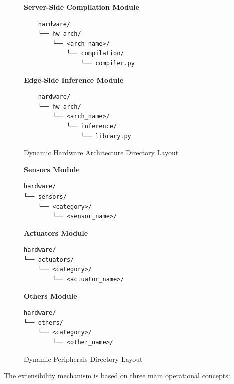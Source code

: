 \begin{figure}[H]
    \centering
    \begin{minipage}{0.48\textwidth}
        \centering
        \textbf{Server-Side Compilation Module}
        \begin{verbatim}
    hardware/
    └── hw_arch/
        └── <arch_name>/
            └── compilation/
                └── compiler.py
        \end{verbatim}
    \end{minipage}
    \hfill
    \begin{minipage}{0.48\textwidth}
        \centering
        \textbf{Edge-Side Inference Module}
        \begin{verbatim}
    hardware/
    └── hw_arch/
        └── <arch_name>/
            └── inference/
                └── library.py
        \end{verbatim}
    \end{minipage}
    \caption{Dynamic Hardware Architecture Directory Layout}
    \label{fig:hw_arch_layout}
\end{figure}

\begin{figure}[H]
    \centering
    \begin{minipage}{0.23\textwidth}
        \centering
        \textbf{Sensors Module}
        \begin{verbatim}
hardware/
└── sensors/
    └── <category>/
        └── <sensor_name>/
        \end{verbatim}
    \end{minipage}
    \hfill
    \begin{minipage}{0.23\textwidth}
        \centering
        \textbf{Actuators Module}
        \begin{verbatim}
hardware/
└── actuators/
    └── <category>/
        └── <actuator_name>/
        \end{verbatim}
    \end{minipage}
    \hfill
    \begin{minipage}{0.23\textwidth}
        \centering
        \textbf{Others Module}
        \begin{verbatim}
hardware/
└── others/
    └── <category>/
        └── <other_name>/
        \end{verbatim}
    \end{minipage}
    \caption{Dynamic Peripherals Directory Layout}
    \label{fig:peripherals_layout}
\end{figure}

The extensibility mechanism is based on three main operational concepts:

